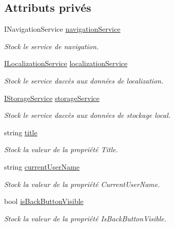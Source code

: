 \subsection*{Attributs privés}
\begin{DoxyCompactItemize}
\item 
I\+Navigation\+Service \hyperlink{class_boxes_1_1_view_models_1_1_shell_view_model_a6d3eb71e962c5743cbe88c6965bb0d56}{navigation\+Service}
\begin{DoxyCompactList}\small\item\em Stock le service de navigation. \end{DoxyCompactList}\item 
\hyperlink{interface_boxes_1_1_services_1_1_localization_1_1_i_localization_service}{I\+Localization\+Service} \hyperlink{class_boxes_1_1_view_models_1_1_shell_view_model_affb3ef1bb3aec55f80714a2fa4fd79a1}{localization\+Service}
\begin{DoxyCompactList}\small\item\em Stock le service d\textquotesingle{}accès aux données de localization. \end{DoxyCompactList}\item 
\hyperlink{interface_boxes_1_1_services_1_1_storage_1_1_i_storage_service}{I\+Storage\+Service} \hyperlink{class_boxes_1_1_view_models_1_1_shell_view_model_a8be9f33243fd2a7427d2d36f1276d3a5}{storage\+Service}
\begin{DoxyCompactList}\small\item\em Stock le service d\textquotesingle{}accès aux données de stockage local. \end{DoxyCompactList}\item 
string \hyperlink{class_boxes_1_1_view_models_1_1_shell_view_model_ae4eac58ce406c6ece587a7c06ed5623f}{title}
\begin{DoxyCompactList}\small\item\em Stock la valeur de la propriété {\ttfamily Title}. \end{DoxyCompactList}\item 
string \hyperlink{class_boxes_1_1_view_models_1_1_shell_view_model_a13ccc8c0cc1c0df72a2780c55f866ec2}{current\+User\+Name}
\begin{DoxyCompactList}\small\item\em Stock la valeur de la propriété {\ttfamily Current\+User\+Name}. \end{DoxyCompactList}\item 
bool \hyperlink{class_boxes_1_1_view_models_1_1_shell_view_model_a455d23b6128ff0a05072a61ace6dfa65}{is\+Back\+Button\+Visible}
\begin{DoxyCompactList}\small\item\em Stock la valeur de la propriété {\ttfamily Is\+Back\+Button\+Visible}. \end{DoxyCompactList}\end{DoxyCompactItemize}


